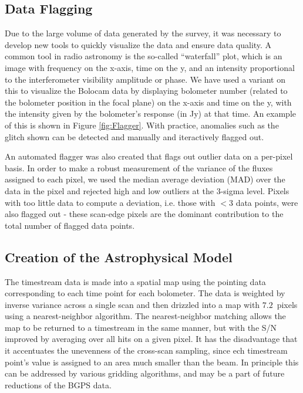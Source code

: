 \documentclass[12pt,preprint]{aastex}
\begin{document}
\subsection{Data Flagging}

Due to the large volume of data generated by the survey, it was
necessary to develop new tools to quickly visualize the data and
ensure data quality.  A common tool in radio astronomy is the
so-called ``waterfall'' plot, which is an image with frequency on the
x-axis, time on the y, and an intensity proportional to the
interferometer visibility amplitude or phase.  We have used a variant
on this to visualize the Bolocam data by displaying bolometer number
(related to the bolometer position in the focal plane) on the x-axis
and time on the y, with the intensity given by the bolometer's
response (in Jy) at that time.  An example of this is shown in Figure
\ref{fig:Flagger}.  With practice, anomalies such as the glitch shown
can be detected and manually and iteractively flagged out.

An automated flagger was also created that flags out outlier data on a
per-pixel basis.  In order to make a robust measurement of the
variance of the fluxes assigned to each pixel, we used the median
average deviation (MAD) over the data in the pixel and rejected high and low
outliers at the 3-sigma level.  Pixels with too little data to compute
a deviation, i.e. those with $<3$ data points, were also flagged out -
these scan-edge pixels are the dominant contribution to the total
number of flagged data points.

\subsection{Creation of the Astrophysical Model}

The timestream data is made into a spatial map using the pointing data
corresponding to each time point for each bolometer.  The data is
weighted by inverse variance across a single scan and then drizzled
into a map with $7.2$\arcsec\ pixels using a nearest-neighbor
algorithm.  The nearest-neighbor matching allows the map to be
returned to a timestream in the same manner, but with the S/N improved
by averaging over all hits on a given pixel.  It has the disadvantage
that it accentuates the unevenness of the cross-scan sampling, since
ech timestream point's value is assigned to an area much smaller than
the beam.  In principle this can be addressed by various gridding
algorithms, and may be a part of future reductions of the BGPS data.
\end{document}
